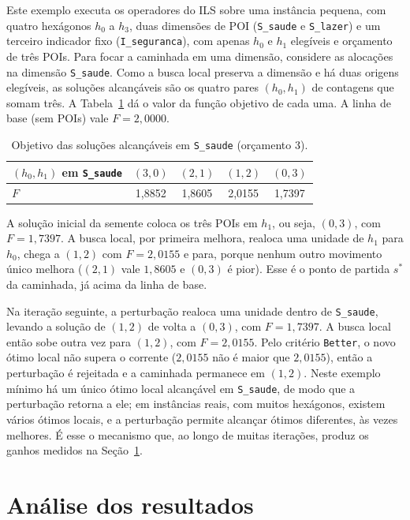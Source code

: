 \documentclass[11pt,a4paper]{article}
\newcommand{\code}[1]{\texttt{#1}}
\begin{document}
Este exemplo executa os operadores do ILS sobre uma instância pequena, com quatro hexágonos $h_0$ a $h_3$, duas dimensões de POI (\code{S\_saude} e \code{S\_lazer}) e um terceiro indicador fixo (\code{I\_seguranca}), com apenas $h_0$ e $h_1$ elegíveis e orçamento de três POIs. Para focar a caminhada em uma dimensão, considere as alocações na dimensão \code{S\_saude}. Como a busca local preserva a dimensão e há duas origens elegíveis, as soluções alcançáveis são os quatro pares $(h_0, h_1)$ de contagens que somam três. A Tabela~\ref{tab:toy-ils} dá o valor da função objetivo de cada uma. A linha de base (sem POIs) vale $F = 2{,}0000$.

\begin{table}[h]
\centering
\caption{Objetivo das soluções alcançáveis em \code{S\_saude} (orçamento 3).}
\label{tab:toy-ils}
\begin{tabular}{@{}lcccc@{}}
\toprule
$(h_0, h_1)$ em \code{S\_saude} & $(3,0)$ & $(2,1)$ & $(1,2)$ & $(0,3)$ \\
\midrule
$F$ & 1,8852 & 1,8605 & 2,0155 & 1,7397 \\
\bottomrule
\end{tabular}
\end{table}

A solução inicial da semente coloca os três POIs em $h_1$, ou seja, $(0,3)$, com $F = 1{,}7397$. A busca local, por primeira melhora, realoca uma unidade de $h_1$ para $h_0$, chega a $(1,2)$ com $F = 2{,}0155$ e para, porque nenhum outro movimento único melhora ($(2,1)$ vale $1{,}8605$ e $(0,3)$ é pior). Esse é o ponto de partida $s^\ast$ da caminhada, já acima da linha de base.

Na iteração seguinte, a perturbação realoca uma unidade dentro de \code{S\_saude}, levando a solução de $(1,2)$ de volta a $(0,3)$, com $F = 1{,}7397$. A busca local então sobe outra vez para $(1,2)$, com $F = 2{,}0155$. Pelo critério \code{Better}, o novo ótimo local não supera o corrente ($2{,}0155$ não é maior que $2{,}0155$), então a perturbação é rejeitada e a caminhada permanece em $(1,2)$. Neste exemplo mínimo há um único ótimo local alcançável em \code{S\_saude}, de modo que a perturbação retorna a ele; em instâncias reais, com muitos hexágonos, existem vários ótimos locais, e a perturbação permite alcançar ótimos diferentes, às vezes melhores. É esse o mecanismo que, ao longo de muitas iterações, produz os ganhos medidos na Seção~\ref{sec:ils-analise}.

\section{Análise dos resultados}
\label{sec:ils-analise}
\end{document}
